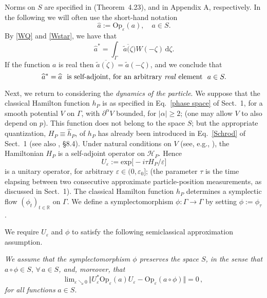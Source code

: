 \documentclass[11pt]{article}
\begin{document}
Norms on $S$ are specified in \cite{Zworski} (Theorem~4.23), and in Appendix A, respectively.
 In the following we will often use the short-hand notation
$$\widehat{a}:= \text{Op}_{\varepsilon} (a), \quad a\in S.$$
By \eqref{WQ} and \eqref{Wstar}, we have that
$$\widehat{a}^{*} =\int_{\Gamma} \overline{\tilde{a}(\zeta}) W(-\zeta)\,\text{d}\zeta.$$
 If the function $a$ is real then $\overline{\tilde{a}(\zeta)}=\tilde{a}(-\zeta)$, and we  conclude that 
 $$\widehat{a}^{*} = \widehat{a} \,\,\text{ is self-adjoint}, \, \text{for an arbitrary \textit{real} element }\,\, a\in S.$$
 
 Next, we return to considering the \textit{dynamics of the particle}. We suppose that the classical Hamilton function $h_P$ 
 is as specified in Eq.~\eqref{phase space} of Sect.~1, for a smooth potential $V$ on $\Gamma$, with $\partial^{\alpha}V$ 
 bounded, for $\vert \alpha \vert \geq 2$; (one may allow $V$ to also depend on $p$). This function does not belong to the 
 space $S$; but the appropriate  quantization, $H_P\equiv \widehat{h}_P$, of $h_P$ has already been introduced 
 in Eq.~\eqref{Schrod} of Sect.~1 (see also \cite{DerGerard}, \S 8.4). Under natural conditions on $V$ (see, e.g., \cite{BS}), the Hamiltonian $H_P$ 
 is a self-adjoint operator on $\mathcal{H}_P$. 
 Hence 
 \begin{equation}\label{propagator}
 U_{\varepsilon} := \text{exp}\big[-i \tau H_P/\varepsilon \big]
 \end{equation}
 is a unitary operator, for arbitrary $\varepsilon \in (0, \varepsilon_0]$;  (the parameter $\tau$ is the time elapsing 
 between two consecutive approximate particle-position measurements, as discussed in Sect.~1). The classical 
 Hamilton function $h_P$ determines a symplectic flow $(\phi_t)_{t\in \mathbb{R}}$ on $\Gamma$. 
 We define a symplectomorphism $\phi: \Gamma \rightarrow \Gamma$ by setting $\phi:= \phi_{\tau}$. 
  
We require $U_{\varepsilon}$ and $\phi$ to satisfy the following semiclassical approximation assumption.%

\vspace{0.15cm} \textit{We assume that the symplectomorphism $\phi$ preserves the space $S$, 
in the sense that $a\circ \phi \in S, \,\forall \, a\in S$, and, moreover, that}
\begin{equation}\label{Egorov}
\text{lim}_{\varepsilon \searrow 0}\, \Vert U_{\varepsilon}^{*} \text{Op}_{\varepsilon}(a)U_{\varepsilon} - 
\text{Op}_{\varepsilon}(a\circ \phi) \Vert =0\,,
\end{equation}
\textit{ for all functions} $a\in S$.\\
\end{document}
